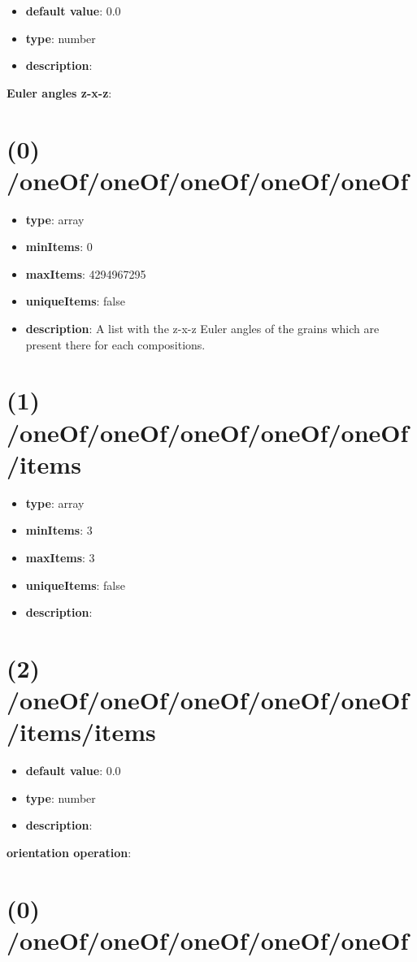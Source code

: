 \begin{itemize}[leftmargin=3em]\item {\bf default value}: 0.0
\item {\bf type}: number
\item {\bf description}: 
\end{itemize}\item {\bf Euler angles z-x-z}: \section{(0) /oneOf/oneOf/oneOf/oneOf/oneOf}
\begin{itemize}[leftmargin=0em]\item {\bf type}: array
\item {\bf minItems}: 0
\item {\bf maxItems}: 4294967295
\item {\bf uniqueItems}: false
\item {\bf description}: A list with the z-x-z Euler angles of the grains which are present there for each compositions.
\end{itemize}\section{(1) /oneOf/oneOf/oneOf/oneOf/oneOf/items}
\begin{itemize}[leftmargin=1em]\item {\bf type}: array
\item {\bf minItems}: 3
\item {\bf maxItems}: 3
\item {\bf uniqueItems}: false
\item {\bf description}: 
\end{itemize}\section{(2) /oneOf/oneOf/oneOf/oneOf/oneOf/items/items}
\begin{itemize}[leftmargin=2em]\item {\bf default value}: 0.0
\item {\bf type}: number
\item {\bf description}: 
\end{itemize}\item {\bf orientation operation}: \section{(0) /oneOf/oneOf/oneOf/oneOf/oneOf}
